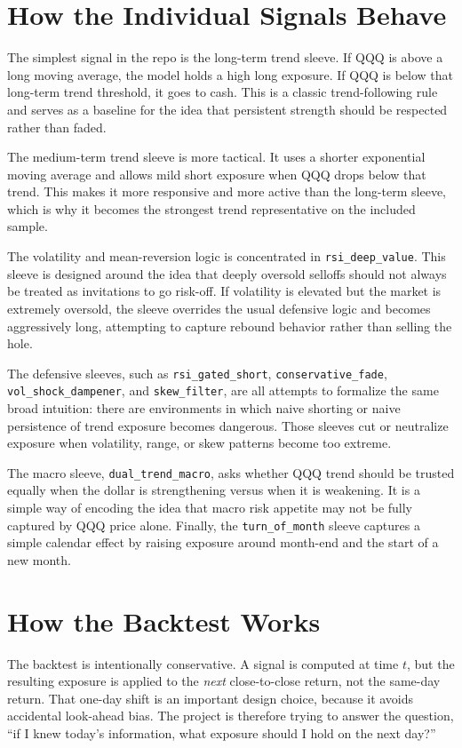 \documentclass[11pt]{article}
\begin{document}
\section*{How the Individual Signals Behave}

The simplest signal in the repo is the long-term trend sleeve. If QQQ is above a
long moving average, the model holds a high long exposure. If QQQ is below that
long-term trend threshold, it goes to cash. This is a classic trend-following
rule and serves as a baseline for the idea that persistent strength should be
respected rather than faded.

The medium-term trend sleeve is more tactical. It uses a shorter exponential
moving average and allows mild short exposure when QQQ drops below that trend.
This makes it more responsive and more active than the long-term sleeve, which
is why it becomes the strongest trend representative on the included sample.

The volatility and mean-reversion logic is concentrated in \texttt{rsi\_deep\_value}.
This sleeve is designed around the idea that deeply oversold selloffs should not
always be treated as invitations to go risk-off. If volatility is elevated but
the market is extremely oversold, the sleeve overrides the usual defensive logic
and becomes aggressively long, attempting to capture rebound behavior rather than
selling the hole.

The defensive sleeves, such as \texttt{rsi\_gated\_short},
\texttt{conservative\_fade}, \texttt{vol\_shock\_dampener}, and
\texttt{skew\_filter}, are all attempts to formalize the same broad intuition:
there are environments in which naive shorting or naive persistence of trend
exposure becomes dangerous. Those sleeves cut or neutralize exposure when
volatility, range, or skew patterns become too extreme.

The macro sleeve, \texttt{dual\_trend\_macro}, asks whether QQQ trend should be
trusted equally when the dollar is strengthening versus when it is weakening. It
is a simple way of encoding the idea that macro risk appetite may not be fully
captured by QQQ price alone. Finally, the \texttt{turn\_of\_month} sleeve captures
a simple calendar effect by raising exposure around month-end and the start of a
new month.

\section*{How the Backtest Works}

The backtest is intentionally conservative. A signal is computed at time \(t\),
but the resulting exposure is applied to the \emph{next} close-to-close return,
not the same-day return. That one-day shift is an important design choice,
because it avoids accidental look-ahead bias. The project is therefore trying to
answer the question, ``if I knew today's information, what exposure should I
hold on the next day?''
\end{document}
